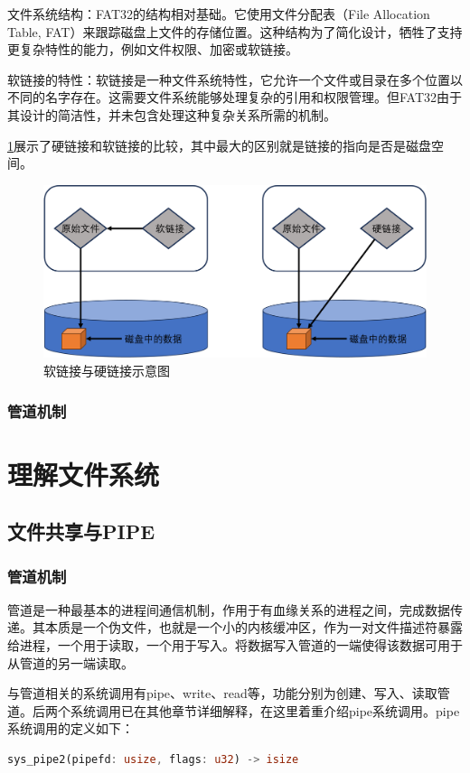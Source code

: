 文件系统结构：FAT32的结构相对基础。它使用文件分配表（File Allocation Table, FAT）来跟踪磁盘上文件的存储位置。这种结构为了简化设计，牺牲了支持更复杂特性的能力，例如文件权限、加密或软链接。

软链接的特性：软链接是一种文件系统特性，它允许一个文件或目录在多个位置以不同的名字存在。这需要文件系统能够处理复杂的引用和权限管理。但FAT32由于其设计的简洁性，并未包含处理这种复杂关系所需的机制。

\ref{fig:link}展示了硬链接和软链接的比较，其中最大的区别就是链接的指向是否是磁盘空间。

\begin{figure}[htb]
    \centering
    \includegraphics[width=\textwidth]{figures/07-09-软连接与硬连接示意图.png}
    \caption{
        软链接与硬链接示意图
    }
    \label{fig:link}
\end{figure}

\subsection{管道机制}

\chapter{理解文件系统}
\section{文件共享与PIPE}
\subsection{管道机制}
管道是一种最基本的进程间通信机制，作用于有血缘关系的进程之间，完成数据传递。其本质是一个伪文件，也就是一个小的内核缓冲区，作为一对文件描述符暴露给进程，一个用于读取，一个用于写入。将数据写入管道的一端使得该数据可用于从管道的另一端读取。

与管道相关的系统调用有pipe、write、read等，功能分别为创建、写入、读取管道。后两个系统调用已在其他章节详细解释，在这里着重介绍pipe系统调用。pipe系统调用的定义如下：
\begin{lstlisting}[language=rust]
    sys_pipe2(pipefd: usize, flags: u32) -> isize
\end{lstlisting}

